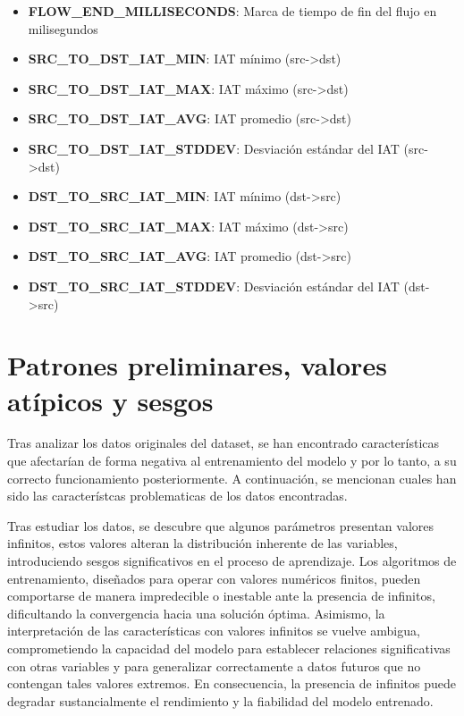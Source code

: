 \begin{itemize}
    \item \textbf{FLOW\_END\_MILLISECONDS}: Marca de tiempo de fin del flujo en milisegundos
    \item \textbf{SRC\_TO\_DST\_IAT\_MIN}: IAT mínimo (src->dst)
    \item \textbf{SRC\_TO\_DST\_IAT\_MAX}: IAT máximo (src->dst)
    \item \textbf{SRC\_TO\_DST\_IAT\_AVG}: IAT promedio (src->dst)
    \item \textbf{SRC\_TO\_DST\_IAT\_STDDEV}: Desviación estándar del IAT (src->dst)
    \item \textbf{DST\_TO\_SRC\_IAT\_MIN}: IAT mínimo (dst->src)
    \item \textbf{DST\_TO\_SRC\_IAT\_MAX}: IAT máximo (dst->src)
    \item \textbf{DST\_TO\_SRC\_IAT\_AVG}: IAT promedio (dst->src)
    \item \textbf{DST\_TO\_SRC\_IAT\_STDDEV}: Desviación estándar del IAT (dst->src)
\end{itemize}

\section{Patrones preliminares, valores atípicos y sesgos} \label{sec.segos-datos}

Tras analizar los datos originales del dataset, se han encontrado características que afectarían de forma negativa al entrenamiento del modelo y por lo tanto, a su correcto funcionamiento posteriormente. A continuación, se mencionan cuales han sido las característcas problematicas de los datos encontradas.


Tras estudiar los datos, se descubre que algunos parámetros presentan valores infinitos, estos valores alteran la distribución inherente de las variables, introduciendo sesgos significativos en el proceso de aprendizaje. Los algoritmos de entrenamiento, diseñados para operar con valores numéricos finitos, pueden comportarse de manera impredecible o inestable ante la presencia de infinitos, dificultando la convergencia hacia una solución óptima. Asimismo, la interpretación de las características con valores infinitos se vuelve ambigua, comprometiendo la capacidad del modelo para establecer relaciones significativas con otras variables y para generalizar correctamente a datos futuros que no contengan tales valores extremos. En consecuencia, la presencia de infinitos puede degradar sustancialmente el rendimiento y la fiabilidad del modelo entrenado.

